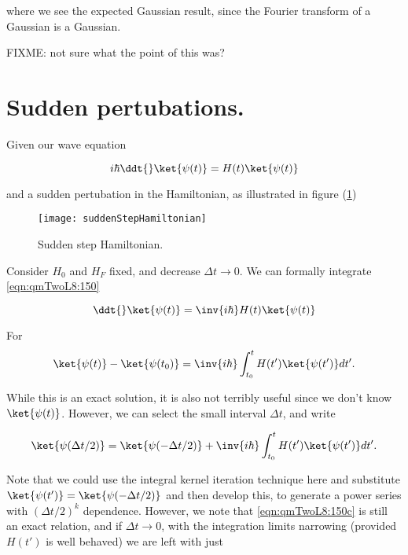 where we see the expected Gaussian result, since the Fourier transform of a Gaussian is a Gaussian.

FIXME: not sure what the point of this was?

\section{Sudden pertubations.}

Given our wave equation

\begin{equation}\label{eqn:qmTwoL8:150}
i \hbar \ddt{} \ket{\psi(t)} = H(t) \ket{\psi(t)}
\end{equation}

and a sudden pertubation in the Hamiltonian, as illustrated in figure (\ref{fig:suddenStepHamiltonian})

\begin{figure}[htp]
\centering
\texttt{[image: suddenStepHamiltonian]}
\caption{Sudden step Hamiltonian.}\label{fig:suddenStepHamiltonian}
\end{figure}

Consider $H_0$ and $H_F$ fixed, and decrease $\Delta t \rightarrow 0$.  We can formally integrate \ref{eqn:qmTwoL8:150}

\begin{equation}\label{eqn:qmTwoL8:150b}
\ddt{} \ket{\psi(t)} = \inv{i \hbar} H(t) \ket{\psi(t)}
\end{equation}

For
\begin{equation}\label{eqn:qmTwoL8:150e}
\ket{\psi(t)} -\ket{\psi(t_0)}
 = \inv{i \hbar} \int_{t_0}^t H(t') \ket{\psi(t')} dt'.
\end{equation}

While this is an exact solution, it is also not terribly useful since we don't know $\ket{\psi(t)}$.  However, we can select the small interval $\Delta t$, and write

\begin{equation}\label{eqn:qmTwoL8:150c}
\ket{\psi(\Delta t/2)} =
\ket{\psi(-\Delta t/2)}
+ \inv{i \hbar} \int_{t_0}^t H(t') \ket{\psi(t')} dt'.
\end{equation}

Note that we could use the integral kernel iteration technique here and substitute $\ket{\psi(t')} = \ket{\psi(-\Delta t/2)}$ and then develop this, to generate a power series with $(\Delta t/2)^k$ dependence.  However, we note that \ref{eqn:qmTwoL8:150c} is still an exact relation, and if $\Delta t \rightarrow 0$, with the integration limits narrowing (provided $H(t')$ is well behaved) we are left with just

